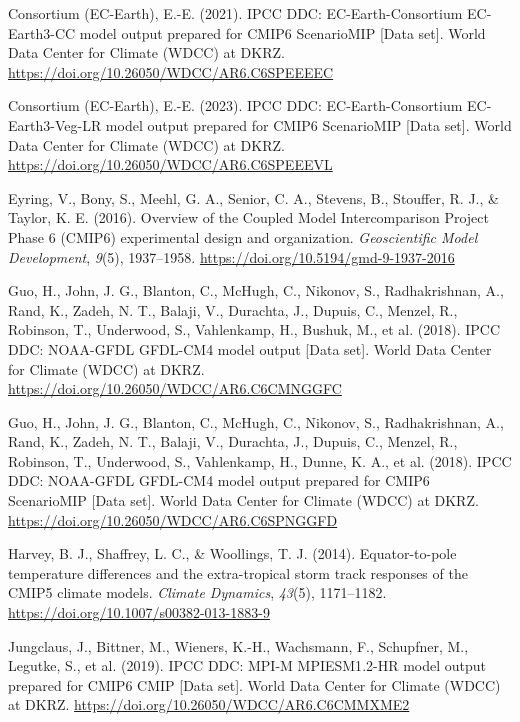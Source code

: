 \documentclass[
]{agujournal2019}
\newlength{\cslhangindent}
\newenvironment{CSLReferences}[2] %
 {\begin{list}{}{%
  \setlength{\itemindent}{0pt}
  \setlength{\leftmargin}{0pt}
  \setlength{\parsep}{0pt}
  \ifodd #1
   \setlength{\leftmargin}{\cslhangindent}
   \setlength{\itemindent}{-1\cslhangindent}
  \fi
  \setlength{\itemsep}{#2\baselineskip}}}
 {\end{list}}
\begin{document}
\begin{CSLReferences}{1}{0}
Consortium (EC-Earth), E.-E. (2021). {IPCC DDC}: {EC-Earth-Consortium
EC-Earth3-CC} model output prepared for {CMIP6 ScenarioMIP} {[}Data
set{]}. World Data Center for Climate (WDCC) at DKRZ.
\url{https://doi.org/10.26050/WDCC/AR6.C6SPEEEEC}

Consortium (EC-Earth), E.-E. (2023). {IPCC DDC}: {EC-Earth-Consortium
EC-Earth3-Veg-LR} model output prepared for {CMIP6 ScenarioMIP} {[}Data
set{]}. World Data Center for Climate (WDCC) at DKRZ.
\url{https://doi.org/10.26050/WDCC/AR6.C6SPEEEVL}

Eyring, V., Bony, S., Meehl, G. A., Senior, C. A., Stevens, B.,
Stouffer, R. J., \& Taylor, K. E. (2016). Overview of the {Coupled Model
Intercomparison Project Phase} 6 ({CMIP6}) experimental design and
organization. \emph{Geoscientific Model Development}, \emph{9}(5),
1937--1958. \url{https://doi.org/10.5194/gmd-9-1937-2016}

Guo, H., John, J. G., Blanton, C., McHugh, C., Nikonov, S.,
Radhakrishnan, A., Rand, K., Zadeh, N. T., Balaji, V., Durachta, J.,
Dupuis, C., Menzel, R., Robinson, T., Underwood, S., Vahlenkamp, H.,
Bushuk, M., et al. (2018). {IPCC DDC}: {NOAA-GFDL GFDL-CM4} model output
{[}Data set{]}. World Data Center for Climate (WDCC) at DKRZ.
\url{https://doi.org/10.26050/WDCC/AR6.C6CMNGGFC}

Guo, H., John, J. G., Blanton, C., McHugh, C., Nikonov, S.,
Radhakrishnan, A., Rand, K., Zadeh, N. T., Balaji, V., Durachta, J.,
Dupuis, C., Menzel, R., Robinson, T., Underwood, S., Vahlenkamp, H.,
Dunne, K. A., et al. (2018). {IPCC DDC}: {NOAA-GFDL GFDL-CM4} model
output prepared for {CMIP6 ScenarioMIP} {[}Data set{]}. World Data
Center for Climate (WDCC) at DKRZ.
\url{https://doi.org/10.26050/WDCC/AR6.C6SPNGGFD}

Harvey, B. J., Shaffrey, L. C., \& Woollings, T. J. (2014).
Equator-to-pole temperature differences and the extra-tropical storm
track responses of the {CMIP5} climate models. \emph{Climate Dynamics},
\emph{43}(5), 1171--1182.
\url{https://doi.org/10.1007/s00382-013-1883-9}

Jungclaus, J., Bittner, M., Wieners, K.-H., Wachsmann, F., Schupfner,
M., Legutke, S., et al. (2019). {IPCC DDC}: {MPI-M MPIESM1}.2-{HR} model
output prepared for {CMIP6 CMIP} {[}Data set{]}. World Data Center for
Climate (WDCC) at DKRZ.
\url{https://doi.org/10.26050/WDCC/AR6.C6CMMXME2}


\end{CSLReferences}
\end{document}
